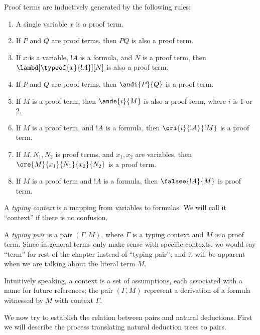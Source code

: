 \documentclass[../../../include/open-logic-section]{subfiles}
\begin{document}

\begin{defn}
  Proof terms are inductively generated by the following rules:
  \begin{enumerate}
  \item A single variable $x$ is a proof term.
  \item If $P$ and $Q$ are proof terms, then $PQ$ is also a proof
    term.
  \item If $x$ is a variable, $!A$ is a formula, and $N$ is a proof
    term, then $\lambd[\typeof{x}{!A}][N]$ is also a proof term.
  \item If $P$ and $Q$ are proof terms, then $\andi{P}{Q}$ is a proof
    term.
  \item If $M$ is a proof term, then $\ande{i}{M}$ is also a proof
    term, where $i$ is $1$ or $2$.
  \item If $M$ is a proof term, and $!A$ is a formula, then
    $\ori{i}{!A}{!M}$ is a proof term.
  \item If $M, N_1, N_2$ is proof terms, and $x_1, x_2$ are variables,
    then $\ore{M}{x_1}{N_1}{x_2}{N_2}$ is a proof term.
  \item If $M$ is a proof term and $!A$ is a formula, then
    $\falsee{!A}{M}$ is proof term.
  \end{enumerate}
\end{defn}

\begin{defn}
  A \emph{typing context} is a mapping from variables to formulas. We
  will call it ``context'' if there is no confusion.
\end{defn}

\begin{defn}
  A \emph{typing pair} is a pair $(\Gamma, M)$,
  where $\Gamma$ is a typing context and $M$ is a proof term. Since
  in general terms only make sense with specific contexts, we would
  say ``term'' for rest of the chapter instead of ``typing pair''; and
  it will be apparent when we are talking about the literal term $M$.
\end{defn}

Intuitively speaking, a context is a set of assumptions, each
associated with a name for future references; the pair $(\Gamma, M)$
represent a derivation of a formula witnessed by $M$ with context $\Gamma$.

We now try to establish the relation between pairs and natural
deductions. First we will describe the process translating natural
deduction trees to pairs.
\end{document}
